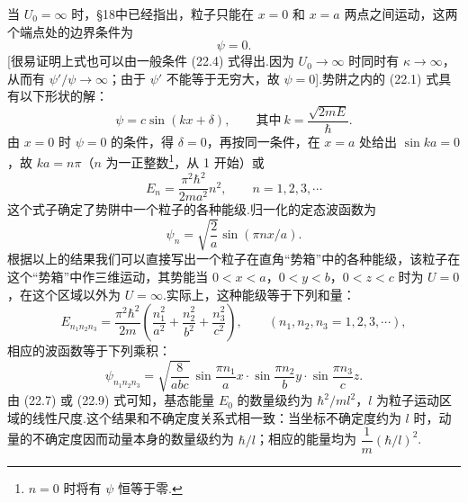 当 $U_0=\infty$ 时，§18中已经指出，粒子只能在 $x=0$ 和 $x=a$ 两点之间运动，这两个端点处的边界条件为
\begin{equation}
  \psi=0.
\end{equation}
[很易证明上式也可以由一般条件 (22.4) 式得出.因为 $U_0\to\infty$ 时同时有 $\kappa\to\infty$，从而有 $\psi'/\psi\to\infty$；由于 $\psi'$ 不能等于无穷大，故 $\psi=0$].势阱之内的 (22.1) 式具有以下形状的解：
\begin{equation}
  \psi=c\sin\left(kx+\delta\right),
  \qquad\text{其中}\ k=\frac{\sqrt{2mE}}{\hbar}.
\end{equation}
由 $x=0$ 时 $\psi=0$ 的条件，得 $\delta=0$，再按同一条件，在 $x=a$ 处给出 $\sin ka=0$，故 $ka=n\pi$（$n$ 为一正整数\footnote{$n=0$ 时将有 $\psi$ 恒等于零.}，从 1 开始）或
\begin{equation}
  E_n=\frac{\pi^2\hbar^2}{2ma^2}n^2,
  \qquad n=1,2,3,\cdots
\end{equation}
这个式子确定了势阱中一个粒子的各种能级.归一化的定态波函数为
\begin{equation}
  \psi_n=\sqrt{\frac{2}{a}}\sin\left(\pi nx/a\right).
\end{equation}
根据以上的结果我们可以直接写出一个粒子在直角“势箱”中的各种能级，该粒子在这个“势箱”中作三维运动，其势能当 $0<x<a$，$0<y<b$，$0<z<c$ 时为 $U=0$，在这个区域以外为 $U=\infty$.实际上，这种能级等于下列和量：
\begin{equation}
  E_{n_1 n_2 n_3}=\frac{\pi^2\hbar^2}{2m}
  \left(\frac{n_1^2}{a^2}+\frac{n_2^2}{b^2}+\frac{n_3^2}{c^2}\right),
  \qquad\left(n_1,n_2,n_3=1,2,3,\cdots\right),
\end{equation}
相应的波函数等于下列乘积：
\begin{equation}
  \psi_{n_1 n_2 n_3}=\sqrt{\frac{8}{abc}}\,
  \sin\frac{\pi n_1}{a}x\cdot\sin\frac{\pi n_2}{b}y\cdot\sin\frac{\pi n_3}{c}z.
\end{equation}
由 (22.7) 或 (22.9) 式可知，基态能量 $E_0$ 的数量级约为 $\hbar^2/ml^2$，$l$ 为粒子运动区域的线性尺度.这个结果和不确定度关系式相一致：当坐标不确定度约为 $l$ 时，动量的不确定度因而动量本身的数量级约为 $\hbar/l$；相应的能量均为 $\dfrac{1}{m}\left(\hbar/l\right)^2$.

